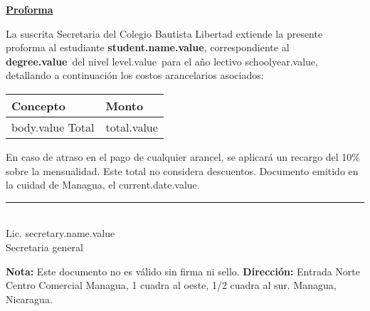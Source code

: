 \documentclass[12pt]{article}
\newcommand{\degreeName}{degree.value}
\newcommand{\levelName}{level.value}
\newcommand{\studentName}{student.name.value}
\newcommand{\schoolYear}{schoolyear.value}
\newcommand{\currentDate}{current.date.value}
\newcommand{\totalAmount}{total.value}
\newcommand{\secretaryName}{secretary.name.value}
\begin{document}
    \begin{center}
        \underline{\textbf{\Large Proforma}}
    \end{center}
    La suscrita Secretaria del Colegio Bautista Libertad extiende la presente proforma al estudiante \textbf{\studentName},
    correspondiente al \textbf{\degreeName}~del nivel \levelName~para el año lectivo \schoolYear, detallando a continuación
    los costos arancelarios asociados:
    \begin{table}[H]
        \centering
        \begin{tabular}{l|l}
            \hline
            Concepto & Monto\\\hline
            body.value \hline
            Total & \totalAmount
        \end{tabular}
    \end{table}
    En caso de atraso en el pago de cualquier arancel, se aplicará un recargo del 10\% sobre la mensualidad.
    Este total no considera descuentos.
    Documento emitido en la cuidad de Managua, el \currentDate.

    \vfill
    \begin{center}
        \rule{5cm}{0.4pt}\\[1mm]
        Lic. \secretaryName\\
        Secretaria general
    \end{center}
    \vfill

    \textbf{Nota:} Este documento no es válido sin firma ni sello.
    \textbf{Dirección:} Entrada Norte Centro Comercial Managua, 1 cuadra al oeste, 1/2 cuadra al sur. Managua, Nicaragua.
\end{document}

